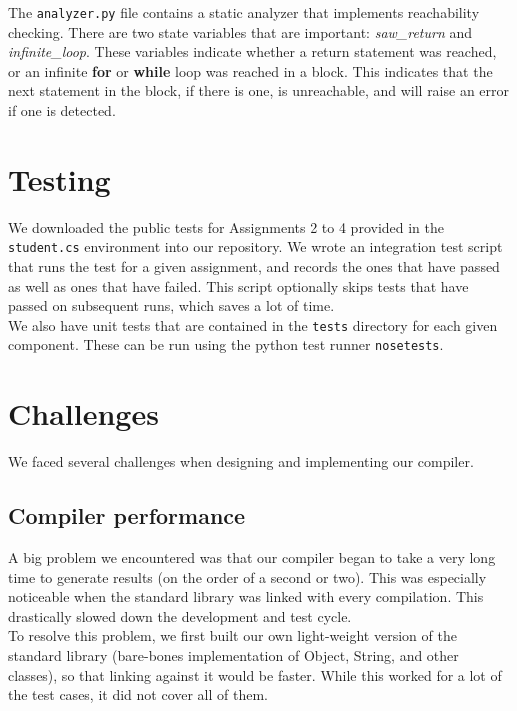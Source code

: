\documentclass[12pt, a4paper]{article}
\newcommand{\method}{\textit}
\begin{document}
The \verb|analyzer.py| file contains a static analyzer that implements reachability checking. There are two state variables that are important: \method{saw\_return} and \method{infinite\_loop}. These variables indicate whether a return statement was reached, or an infinite \textbf{for} or \textbf{while} loop was reached in a block. This indicates that the next statement in the block, if there is one, is unreachable, and will raise an error if one is detected.

\section{Testing}

We downloaded the public tests for Assignments 2 to 4 provided in the \verb|student.cs| environment into our repository. We wrote an integration test script that runs the test for a given assignment, and records the ones that have passed as well as ones that have failed. This script optionally skips  tests that have passed on subsequent runs, which saves a lot of time. \\

We also have unit tests that are contained in the \verb|tests| directory for each given component. These can be run using the python test runner \verb|nosetests|.


\section{Challenges}

We faced several challenges when designing and implementing our compiler.

\subsection{Compiler performance}

A big problem we encountered was that our compiler began to take a very long time to generate results (on the order of a second or two). This was especially noticeable when the standard library was linked with every compilation. This drastically slowed down the development and test cycle. \\

To resolve this problem, we first built our own light-weight version of the standard library (bare-bones implementation of Object, String, and other classes), so that linking against it would be faster. While this worked for a lot of the test cases, it did not cover all of them. \\
\end{document}

